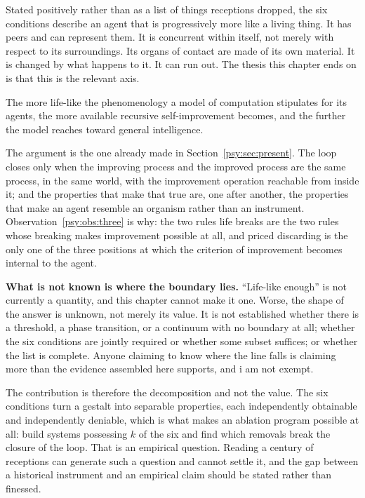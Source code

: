 Stated positively rather than as a list of things receptions
dropped, the six conditions describe an agent that is progressively
more like a living thing.
It has peers and can represent them.
It is concurrent within itself, not merely with respect to its
surroundings.
Its organs of contact are made of its own material.
It is changed by what happens to it.
It can run out.
The thesis this chapter ends on is that this is the relevant axis.

\begin{principle}
\label{psy:prin:lifelike}
The more life-like the phenomenology a model of computation
stipulates for its agents, the more available recursive
self-improvement becomes, and the further the model reaches toward
general intelligence.
\end{principle}

The argument is the one already made in
Section~\ref{psy:sec:present}.
The loop closes only when the improving process and the improved
process are the same process, in the same world, with the
improvement operation reachable from inside it; and the properties
that make that true are, one after another, the properties that make
an agent resemble an organism rather than an instrument.
Observation~\ref{psy:obs:three} is why: the two rules life breaks
are the two rules whose breaking makes improvement possible at all,
and priced discarding is the only one of the three positions at
which the criterion of improvement becomes internal to the agent.

\textbf{What is not known is where the boundary lies.}
``Life-like enough'' is not currently a quantity, and this chapter
cannot make it one.
Worse, the shape of the answer is unknown, not merely its value.
It is not established whether there is a threshold, a phase
transition, or a continuum with no boundary at all; whether the six
conditions are jointly required or whether some subset suffices; or
whether the list is complete.
Anyone claiming to know where the line falls is claiming more than
the evidence assembled here supports, and i am not exempt.

The contribution is therefore the decomposition and not the value.
The six conditions turn a gestalt into separable properties, each
independently obtainable and independently deniable, which is what
makes an ablation program possible at all: build systems possessing
$k$ of the six and find which removals break the closure of the
loop.
That is an empirical question.
Reading a century of receptions can generate such a question and
cannot settle it, and the gap between a historical instrument and an
empirical claim should be stated rather than finessed.

